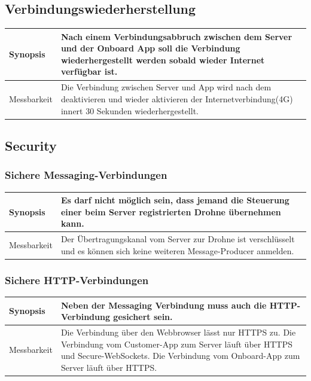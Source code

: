 \subsection{Verbindungswiederherstellung}
\begin{tabular}{|p{}|p{}|} \hline
	Synopsis & Nach einem Verbindungsabbruch zwischen dem Server und der Onboard App soll die Verbindung wiederhergestellt werden sobald wieder Internet verfügbar ist. \\ \hline
	
	Messbarkeit & Die Verbindung zwischen Server und App wird nach dem deaktivieren und wieder aktivieren der Internetverbindung(4G) innert 30 Sekunden wiederhergestellt.\\ \hline
\end{tabular}

\subsection{Security}
\subsubsection{Sichere Messaging-Verbindungen}
\label{sec:message-security}
\begin{tabular}{|p{}|p{}|} \hline
	Synopsis & Es darf nicht möglich sein, dass jemand die Steuerung einer beim Server registrierten Drohne übernehmen kann.\\ \hline
	Messbarkeit & Der Übertragungskanal vom Server zur Drohne ist verschlüsselt und es können sich keine weiteren \Gls{Message-Producer} anmelden.\\ \hline
\end{tabular}

\subsubsection{Sichere HTTP-Verbindungen}
\begin{tabular}{|p{}|p{}|} \hline
	Synopsis & Neben der Messaging Verbindung muss auch die HTTP-Verbindung gesichert sein.\\ \hline
	Messbarkeit & Die Verbindung über den Webbrowser lässt nur HTTPS zu. Die Verbindung vom Customer-App zum Server läuft über HTTPS und Secure-WebSockets. Die Verbindung vom Onboard-App zum Server läuft über HTTPS.\\ \hline
\end{tabular}


